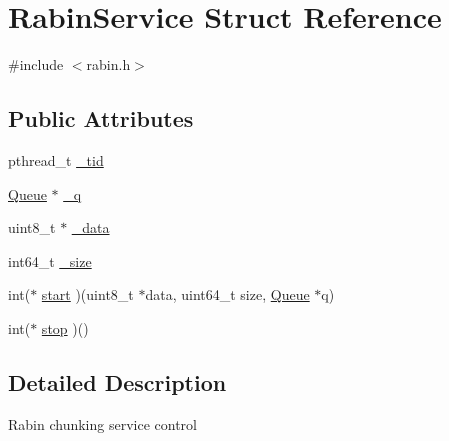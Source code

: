 \hypertarget{structRabinService}{\section{\-Rabin\-Service \-Struct \-Reference}
\label{structRabinService}
}


{\ttfamily \#include $<$rabin.\-h$>$}

\subsection*{\-Public \-Attributes}
\begin{DoxyCompactItemize}
\item 
pthread\-\_\-t \hyperlink{structRabinService_a503127d266fce1634e76b35a21c9a765}{\-\_\-tid}
\item 
\hyperlink{structQueue}{\-Queue} $\ast$ \hyperlink{structRabinService_ad02102e806e0773c7ff5beb9f75452ca}{\-\_\-q}
\item 
uint8\-\_\-t $\ast$ \hyperlink{structRabinService_a8461bfb056954f3c45eeda80cdd4ec7f}{\-\_\-data}
\item 
int64\-\_\-t \hyperlink{structRabinService_afc0cd3b9bc9cd0f91d144476c26202f6}{\-\_\-size}
\item 
int($\ast$ \hyperlink{structRabinService_ae6676668dc7b26b63e977f4958642f02}{start} )(uint8\-\_\-t $\ast$data, uint64\-\_\-t size, \hyperlink{structQueue}{\-Queue} $\ast$q)
\item 
int($\ast$ \hyperlink{structRabinService_a13b8373c32c778481bb39ebc155946ef}{stop} )()
\end{DoxyCompactItemize}


\subsection{\-Detailed \-Description}
\-Rabin chunking service control 


